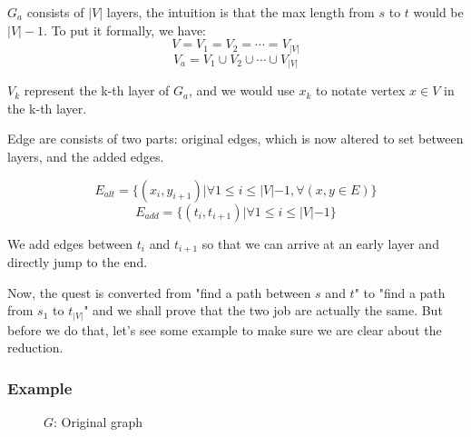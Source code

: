 $G_a$ consists of $|V|$ layers, the intuition is that the max length from $s$ to $t$ would be $|V| - 1$.
To put it formally, we have:
$$V = V_1 = V_2 = \cdots = V_{|V|}$$
$$V_a = V_1 \cup V_2 \cup \cdots \cup V_{|V|}$$

$V_k$ represent the k-th layer of $G_a$, and we would use $x_k$ to notate vertex $x \in V$ in the k-th layer.

Edge are consists of two parts: original edges, which is now altered to set between layers, and the added edges.

$$E_{alt} = \{(x_i, y_{i+1}) | \forall 1 \le i \le |V| - 1, \forall (x, y \in E)\}$$
$$E_{add} = \{(t_i, t_{i+1}) | \forall 1 \le i \le |V| - 1\}$$

We add edges between $t_i$ and $t_{i+1}$ so that we can arrive at an early layer and directly jump to the end.

Now, the quest is converted from "find a path between $s$ and $t$" to "find a path from $s_1$ to $t_{|V|}$" and we shall prove that the two job are actually the same.
But before we do that, let's see some example to make sure we are clear about the reduction.

\subsubsection*{Example}
\begin{figure}[h]
    \centering
    \caption{$G$: Original graph}
\end{figure}

